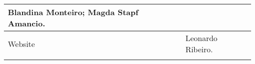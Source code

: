 \documentclass{gescons}
\begin{document}
\begin{longtable}[]{@{}
  >{\raggedright\arraybackslash}p{}
  >{\raggedright\arraybackslash}p{}@{}}
\begin{minipage}[b]{\linewidth}
Blandina Monteiro; Magda Stapf Amancio.
\end{minipage} \\
\hline
\begin{minipage}[b]{\linewidth}\raggedright
Website
\end{minipage} & \begin{minipage}[b]{\linewidth}\raggedright
Leonardo Ribeiro.
\end{minipage} \\
\midrule\noalign{}
\endhead
\bottomrule\noalign{}
\endlastfoot
\end{longtable}


        
\end{document}
